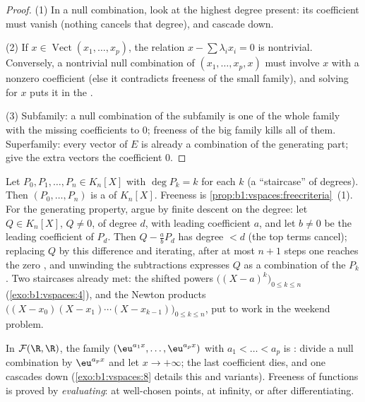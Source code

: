 \begin{proof}
(1) In a null combination, look at the highest degree present: its
coefficient must vanish (nothing cancels that degree), and cascade
down.

(2) If $x \in \operatorname{Vect}(x_1, \dots, x_p)$, the relation $x
- \sum\lambda_i x_i = 0$ is nontrivial. Conversely, a nontrivial
null combination of $(x_1, \dots, x_p, x)$ must involve $x$ with a
nonzero coefficient (else it contradicts freeness of the small
family), and solving for $x$ puts it in the .

(3) Subfamily: a null combination of the subfamily is one of the
whole family with the missing coefficients  to $0$; freeness
of the big family kills all of them. Superfamily: every vector
of $E$ is already a combination of the generating part; give the
extra vectors the coefficient $0$.
\end{proof}

\begin{example}
\label{ex:b1:vspaces:staircase}
Let $P_0, P_1, \dots, P_n \in K_n[X]$ with $\deg P_k = k$ for each
$k$ (a ``staircase'' of degrees). Then $(P_0, \dots, P_n)$ is a
 of $K_n[X]$. Freeness is
\cref{prop:b1:vspaces:freecriteria}~(1). For the generating
property, argue by finite descent on the degree: let $Q \in
K_n[X]$, $Q \neq 0$, of degree $d$, with leading coefficient $a$,
and let $b \neq 0$ be the leading coefficient of $P_d$. Then $Q -
\frac ab P_d$ has degree $< d$ (the top terms cancel); replacing
$Q$ by this difference and iterating, after at most $n + 1$ steps
one reaches the zero , and unwinding the subtractions
expresses $Q$ as a combination of the $P_k$. Two staircases
already met: the shifted powers $\bigl((X-a)^k\bigr)_{0 \leq k
\leq n}$ (\cref{exo:b1:vspaces:4}), and the Newton products
$\bigl((X - x_0)(X - x_1)\cdots(X - x_{k-1})\bigr)_{0 \leq k \leq
n}$, put to work in the weekend problem.
\end{example}

\begin{example}\label{ex:b1:vspaces:functionfree}
In $\mathcal{F}(\R,\R)$, the family $(\eu^{a_1 x}, \dots, \eu^{a_p
x})$ with $a_1 < \dots < a_p$ is : divide a null combination by
$\eu^{a_p x}$ and let $x \to +\infty$; the last coefficient dies,
and one cascades down (\cref{exo:b1:vspaces:8} details this and
variants). Freeness of functions is proved by \emph{evaluating}:
at well-chosen points, at infinity, or after differentiating.
\end{example}

